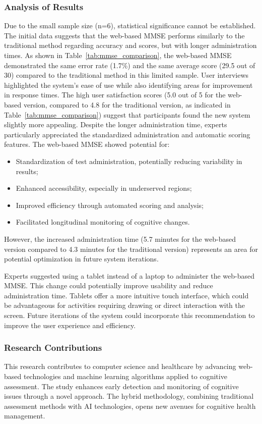 \subsubsection{Analysis of Results}
Due to the small sample size (n=6), statistical significance cannot be established. The initial data suggests that the web-based MMSE performs similarly to the traditional method regarding accuracy and scores, but with longer administration times. As shown in Table~\ref{tab:mmse_comparison}, the web-based MMSE demonstrated the same error rate (1.7\%) and the same average score (29.5 out of 30) compared to the traditional method in this limited sample.
User interviews highlighted the system's ease of use while also identifying areas for improvement in response times. The high user satisfaction scores (5.0 out of 5 for the web-based version, compared to 4.8 for the traditional version, as indicated in Table~\ref{tab:mmse_comparison}) suggest that participants found the new system slightly more appealing. Despite the longer administration time, experts particularly appreciated the standardized administration and automatic scoring features.
The web-based MMSE showed potential for:
\begin{itemize}
\item Standardization of test administration, potentially reducing variability in results;
\item Enhanced accessibility, especially in underserved regions;
\item Improved efficiency through automated scoring and analysis;
\item Facilitated longitudinal monitoring of cognitive changes.
\end{itemize}
However, the increased administration time (5.7 minutes for the web-based version compared to 4.3 minutes for the traditional version) represents an area for potential optimization in future system iterations.

Experts suggested using a tablet instead of a laptop to administer the web-based MMSE. This change could potentially improve usability and reduce administration time. Tablets offer a more intuitive touch interface, which could be advantageous for activities requiring drawing or direct interaction with the screen. Future iterations of the system could incorporate this recommendation to improve the user experience and efficiency.

\subsubsection{Research Contributions}
This research contributes to computer science and healthcare by advancing web-based technologies and machine learning algorithms applied to cognitive assessment. The study enhances early detection and monitoring of cognitive issues through a novel approach. The hybrid methodology, combining traditional assessment methods with AI technologies, opens new avenues for cognitive health management.

